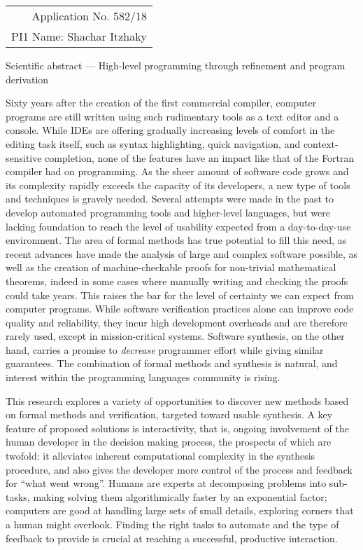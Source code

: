 \documentclass[11pt,a4paper]{article}
\begin{document}
\hfill
\begin{tabular}{r}
Application No. 582/18 \\
PI1 Name: Shachar Itzhaky
\end{tabular}

\medskip\noindent
{%
\fontsize{14pt}{14pt}\selectfont%
Scientific abstract --- High-level programming through refinement and program derivation
}

\medskip
Sixty years after the creation of the first commercial compiler,
computer programs are still written using such rudimentary tools as a text
editor and a console.
While IDEs are offering gradually increasing levels of comfort in the
editing task itself, such as syntax highlighting, quick navigation,
and context-sensitive completion, none of the features have an impact
like that of the Fortran compiler had on programming.
As the sheer amount of software code grows and its complexity rapidly
exceeds the capacity of its developers, a new type of tools and techniques
is gravely needed.
Several attempts were made in the past to develop automated programming
tools and higher-level languages, but were lacking foundation to
reach the level of usability expected from a day-to-day-use environment.
The area of formal methods has true potential to fill this need, as
recent advances have made the analysis of large and complex software
possible, as well as the creation of machine-checkable proofs for
non-trivial mathematical theorems, indeed in some cases where manually
writing and checking the proofs could take years.
This raises the bar for the level of certainty we can expect from
computer programs.
While software verification practices alone can improve code quality
and reliability, they incur high development overheads and are therefore
rarely used, except in mission-critical systems.
Software synthesis, on the other hand, carries a promise to \emph{decrease}
programmer effort while giving similar guarantees.
The combination of formal methods and synthesis is natural, and interest
within the programming languages community is rising.

This research explores a variety of opportunities to discover new methods
based on formal methods and verification, targeted toward usable synthesis.
A key feature of proposed solutions is interactivity, that is, ongoing
involvement of the human developer in the decision making process,
the prospects of which are twofold:
it alleviates inherent computational complexity in the synthesis procedure,
and also gives the developer more control of the process and feedback for
``what went wrong''.
Humans are experts at decomposing problems into sub-tasks, making solving
them algorithmically faster by an exponential factor;
computers are good at handling large sets of small details, exploring
corners that a human might overlook.
Finding the right tasks to automate and the type of feedback to provide
is crucial at reaching a successful, productive interaction.
\end{document}
